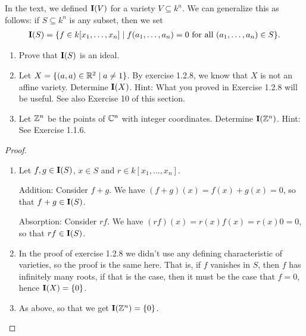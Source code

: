 \begin{exercise}{15}
In the text, we defined $\mathbf{I}(V)$ for a variety $V\subseteq k^n$. 
We can generalize this as follows: 
if $S\subseteq k^n$ is any subset, then we set
\begin{align*}
    \mathbf{I}(S)=\{f\in k[x_1,\dots,x_n]\mid f(a_1,\dots,a_n)=0\text{ for all }(a_1,\dots,a_n)\in S\}.
\end{align*}
\begin{enumerate}
    \item Prove that $\mathbf{I}(S)$ is an ideal.
    \item Let $X=\{(a,a)\in\mathbb{R}^2\mid a\neq 1\}$. 
    By exercise 1.2.8, we know that $X$ is not an affine variety. 
    Determine $\mathbf{I}(X)$. 
    Hint: What you proved in Exercise 1.2.8 will be useful. 
    See also Exercise 10 of this section.
    \item Let $\mathbb{Z}^n$ be the points of $\mathbb{C}^n$ with integer coordinates. Determine $\mathbf{I}(\mathbb{Z}^n)$. Hint: See Exercise 1.1.6.
\end{enumerate}
\end{exercise}
\begin{proof}
\begin{enumerate}
    \item Let $f,g\in\mathbf{I}(S)$, $x\in S$ and $r\in k[x_1,\dots,x_n]$. 

    Addition: Consider $f+g$. 
    We have $(f+g)(x) =f(x)+g(x) =0$, so that $f+g\in\mathbf{I}(S)$.

    Absorption: Consider $rf$. 
    We have $(rf)(x) =r(x)f(x) =r(x)0 =0$, so that $rf\in\mathbf{I}(S)$.
    \item In the proof of exercise 1.2.8 we didn't use any defining characteristic of varieties, so the proof is the same here. 
    That is, if $f$ vanishes in $S$, then $f$ has infinitely many roots, if that is the case, then it must be the case that $f=0$, hence $\mathbf{I}(X)=\{0\}$.
    \item As above, so that we get $\mathbf{I}(\mathbb{Z}^n)=\{0\}$.
\end{enumerate}
\end{proof}

